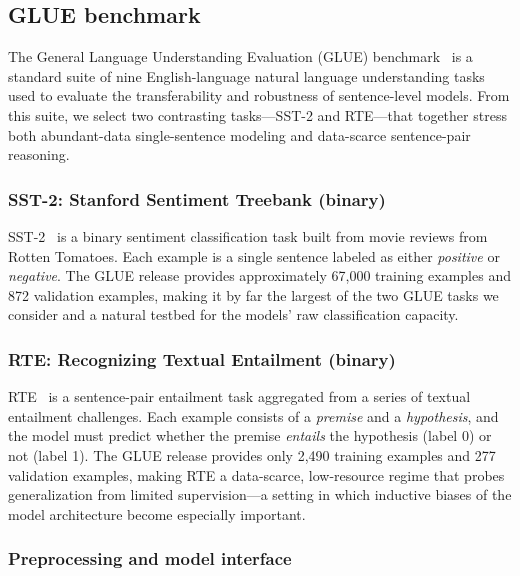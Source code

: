 \documentclass[conference]{IEEEtran}
\begin{document}
\subsection{GLUE benchmark}
\label{sec:glue}

The General Language Understanding Evaluation (GLUE) benchmark~\cite{Wang2018GLUE} is a standard suite of nine English-language natural language understanding tasks used to evaluate the transferability and robustness of sentence-level models.
From this suite, we select two contrasting tasks---SST-2 and RTE---that together stress both abundant-data single-sentence modeling and data-scarce sentence-pair reasoning.

\subsubsection{SST-2: Stanford Sentiment Treebank (binary)}
\label{sec:sst2}

SST-2~\cite{socher2013sst} is a binary sentiment classification task built from movie reviews from Rotten Tomatoes.
Each example is a single sentence labeled as either \emph{positive} or \emph{negative}.
The GLUE release provides approximately 67{,}000 training examples and 872 validation examples, making it by far the largest of the two GLUE tasks we consider and a natural testbed for the models' raw classification capacity.

\subsubsection{RTE: Recognizing Textual Entailment (binary)}
\label{sec:rte}

RTE~\cite{dagan2005pascal,bentivogli2009fifth} is a sentence-pair entailment task aggregated from a series of textual entailment challenges.
Each example consists of a \emph{premise} and a \emph{hypothesis}, and the model must predict whether the premise \emph{entails} the hypothesis (label 0) or not (label 1).
The GLUE release provides only 2{,}490 training examples and 277 validation examples, making RTE a data-scarce, low-resource regime that probes generalization from limited supervision---a setting in which inductive biases of the model architecture become especially important.

\subsubsection{Preprocessing and model interface}
\label{sec:glue_preproc}
\end{document}
